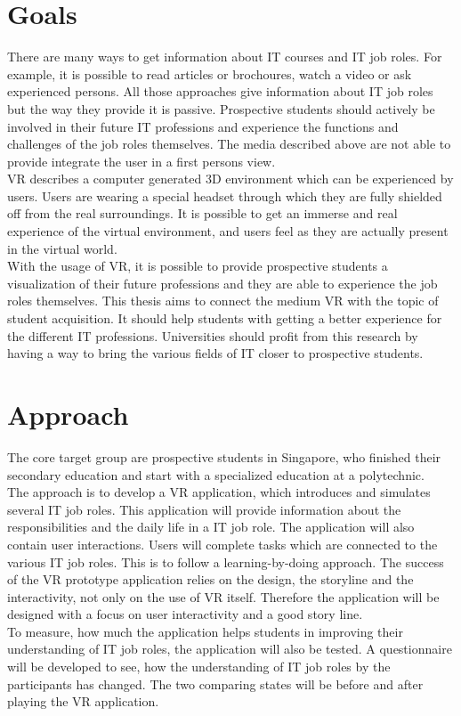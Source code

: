 \section{Goals}
There are many ways to get information about IT courses and IT job roles. For example, it is possible to read articles or brochoures, watch a video or ask experienced persons. All those approaches give information about IT job roles but the way they  provide it is passive. Prospective students should actively be involved in their future IT professions and experience the functions and challenges of the job roles themselves. The media described above are not able to provide integrate the user in a first persons view. \\
 VR describes a computer generated 3D environment which can be experienced by users. Users are wearing a special headset through which they are fully shielded off from the real surroundings. It is possible to get an immerse and real experience of the virtual environment, and users feel as they are actually present in the virtual world. \cite{Linowes.2015}\\
With the usage of VR, it is possible to provide prospective students a visualization of their future professions and they are able to experience the job roles themselves. This thesis aims to connect the medium VR with the topic of student acquisition. It should help students with getting a better experience for the different IT professions. Universities should profit from this research by having a way to bring the various fields of IT closer to prospective students.

\section{Approach}
The core target group are prospective students in Singapore, who finished their secondary education and start with a specialized education at a polytechnic.\\
The approach is to develop a VR application, which introduces and simulates several IT job roles. This application will provide information about the responsibilities and the daily life in a IT job role. The application will also contain user interactions. Users will complete tasks which are connected to the various IT job roles. This is to follow a learning-by-doing approach. The success of the VR prototype application relies on the design, the storyline and the interactivity, not only on the use of VR itself. Therefore the application will be designed with a focus on user interactivity and a good story line.\\
To measure, how much the application helps students in improving their understanding of IT job roles, the application will also be tested. A questionnaire will be developed to see, how the understanding of IT job roles by the participants has changed. The two comparing states will be before and after playing the VR application.

